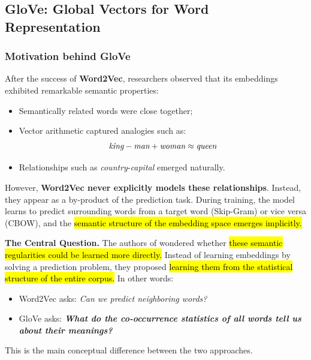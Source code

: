 \subsection{GloVe: Global Vectors for Word Representation}\label{sec:glove-global-vectors-for-word-representation}

\subsubsection{Motivation behind GloVe}\label{sec:motivation-behind-glove}

After the success of \textbf{Word2Vec}, researchers observed that its embeddings exhibited remarkable semantic properties:
\begin{itemize}
    \item Semantically related words were close together;
    \item Vector arithmetic captured analogies such as:
    \begin{equation*}
        \emph{king} - \emph{man} + \emph{woman} \approx \emph{queen}
    \end{equation*}
    \item Relationships such as \emph{country}-\emph{capital} emerged naturally.
\end{itemize}
However, \textbf{Word2Vec never explicitly models these relationships}. Instead, they appear as a by-product of the prediction task. During training, the model learns to predict surrounding words from a target word (Skip-Gram) or vice versa (CBOW), and the \hl{semantic structure of the embedding space emerges implicitly.}

\highspace
\textcolor{Green3}{ \textbf{The Central Question.}} The authors of  \cite{pennington2014glove} wondered whether \hl{these semantic regularities could be learned more directly.} Instead of learning embeddings by solving a prediction problem, they proposed \hl{learning them from the statistical structure of the entire corpus.} In other words:
\begin{itemize}
    \item Word2Vec asks: \emph{Can we predict neighboring words?}
    \item GloVe asks: \emph{\textbf{What do the co-occurrence statistics of all words tell us about their meanings?}}
\end{itemize}
This is the main conceptual difference between the two approaches.

